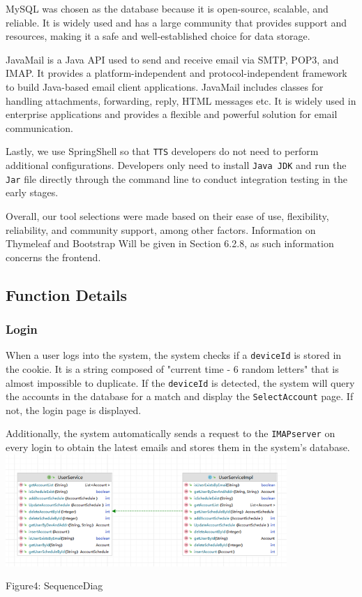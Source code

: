 \documentclass{article}
\begin{document}
MySQL was chosen as the database because it is open-source, scalable, and reliable. It is widely used and has a large community that provides support and resources, making it a safe and well-established choice for data storage.

JavaMail is a Java API used to send and receive email via SMTP, POP3, and IMAP. It provides a platform-independent and protocol-independent framework to build Java-based email client applications. JavaMail includes classes for handling attachments, forwarding, reply, HTML messages etc. It is widely used in enterprise applications and provides a flexible and powerful solution for email communication.

Lastly, we use SpringShell so that \texttt{TTS} developers do not need to perform additional configurations. Developers only need to install \texttt{Java JDK} and run the \texttt{Jar} file directly through the command line to conduct integration testing in the early stages.

Overall, our tool selections were made based on their ease of use, flexibility, reliability, and community support, among other factors. Information on Thymeleaf and Bootstrap Will be given in Section 6.2.8, as such information concerns the frontend.

\subsection{Function Details}
\subsubsection{Login}
When a user logs into the system, the system checks if a \texttt{deviceId} is stored in the cookie. It is a string composed of "current time - 6 random letters" that is almost impossible to duplicate. If the \texttt{deviceId} is detected, the system will query the accounts in the database for a match and display the \texttt{SelectAccount} page. If not, the login page is displayed.

Additionally, the system automatically sends a request to the \texttt{IMAPserver} on every login to obtain the latest emails and stores them in the system's database. \\
\includegraphics[width=0.8\textwidth]{UserService.png}
\begin{center}
Figure4: SequenceDiag
\end{center}
\end{document}
